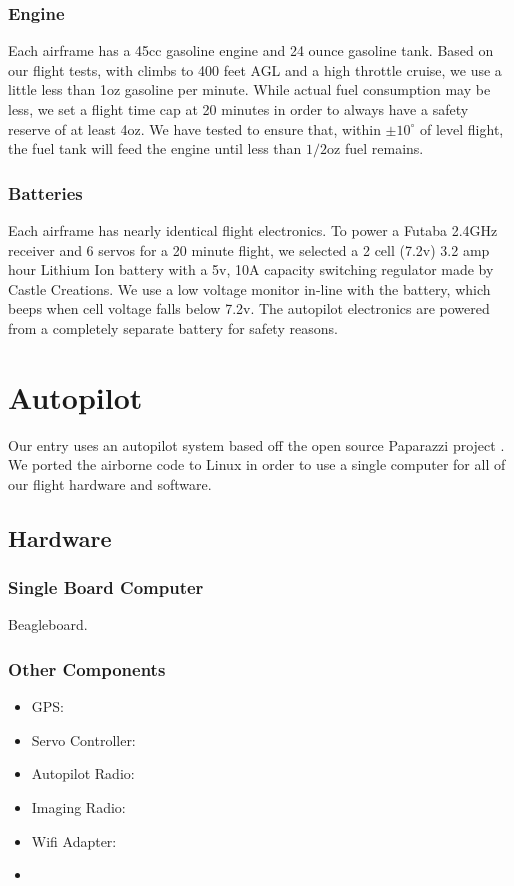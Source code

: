 \documentclass[pdftex,10pt,letter]{article}
\newcommand{\degrees}[1]
{
\begin{math}
#1^{\circ} 
\end{math}
}
\begin{document}
\subsubsection{Engine}

Each airframe has a 45cc gasoline engine and 24 ounce gasoline tank. Based on our flight tests, with climbs to 400 feet AGL and a high throttle cruise, we use a little less than 1oz gasoline per minute. While actual fuel consumption may be less, we set a flight time cap at 20 minutes in order to always have a safety reserve of at least 4oz. We have tested to ensure that, within \degrees{\pm10} of level flight, the fuel tank will feed the engine until less than $1/2$oz fuel remains.

\subsubsection{Batteries}

Each airframe has nearly identical flight electronics. To power a Futaba 2.4GHz receiver and 6 servos for a 20 minute flight, we selected a 2 cell (7.2v) 3.2 amp hour Lithium Ion battery with a 5v, 10A capacity switching regulator made by Castle Creations. We use a low voltage monitor in-line with the battery, which beeps when cell voltage falls below 7.2v. The autopilot electronics are powered from a completely separate battery for safety reasons.

\newpage
\section{Autopilot}
Our entry uses an autopilot system based off the open source Paparazzi project \cite{paparazziweb}. We ported the airborne code to Linux in order to use a single computer for all of our flight hardware and software.

\subsection{Hardware}
\subsubsection{Single Board Computer}
Beagleboard.

\subsubsection{Other Components}
\begin{itemize}
	\setlength{\itemsep}{0cm}
	\setlength{\parskip}{0cm}
	\item GPS: 
	\item Servo Controller:
	\item Autopilot Radio:
	\item Imaging Radio:
	\item Wifi Adapter:
	\item 
\end{itemize}
\end{document}
